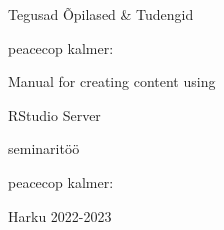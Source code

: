 \begin{titlepage}
\par{Tegusad Õpilased \& Tudengid}
\vspace{0.3\textheight}
\par{peacecop kalmer:}
\LARGE
\par{Manual for creating content using}
\par{RStudio Server}
\normalsize
\par{seminaritöö}
\vspace{0.3\textheight}
\begin{flushright}
\par{peacecop kalmer:}
\end{flushright}
\vfill
Harku
\hfill
2022-2023
\end{titlepage}
